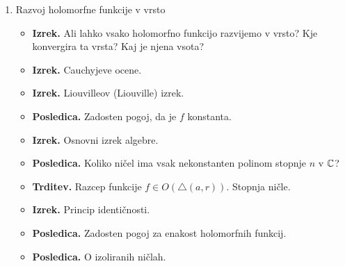 \begin{enumerate}
    \item Razvoj holomorfne funkcije v vrsto
    \begin{itemize}
        \item \textbf{Izrek.} Ali lahko vsako holomorfno funkcijo razvijemo v vrsto? Kje konvergira ta vrsta? Kaj je njena vsota?
        \item \textbf{Izrek.} Cauchyjeve ocene.
        \item \textbf{Izrek.} Liouvilleov (Liouville) izrek.
        \item \textbf{Posledica.} Zadosten pogoj, da je \(f\) konstanta.
        \item \textbf{Izrek.} Osnovni izrek algebre.
        \item \textbf{Posledica.} Koliko ničel ima vsak nekonstanten polinom stopnje \(n\) v \(\mathbb{C}\)?
        \item \textbf{Trditev.} Razcep funkcije \(f \in O(\triangle (a, r))\). Stopnja ničle.
        \item \textbf{Izrek.} Princip identičnosti.
        \item \textbf{Posledica.} Zadosten pogoj za enakost holomorfnih funkcij.
        \item \textbf{Posledica.} O izoliranih ničlah.
    \end{itemize}


\end{enumerate}
